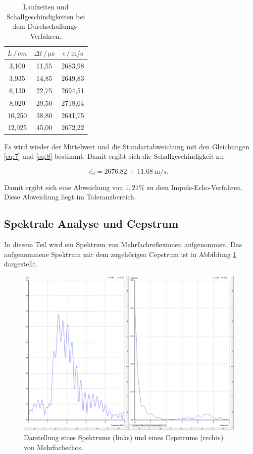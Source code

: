 \begin{table}[H]
  \centering
  \caption{Laufzeiten und Schallgeschindigkeiten bei dem Durchschallungs-Verfahren.}
  \label{tab:5}
  \begin{tabular}{c c c}
    \toprule
    $L \, / \, cm$ & $\Delta t \, / \, \si{\micro\second}$ & $c \, / \, \si{\meter\per\second}$ \\
    \midrule
     3,100 & 11,55 & 2683,98 \\
     3,935 & 14,85 & 2649,83 \\
     6,130 & 22,75 & 2694,51 \\
     8,020 & 29,50 & 2718,64 \\
    10,250 & 38,80 & 2641,75 \\
    12,025 & 45,00 & 2672,22 \\
    \bottomrule
  \end{tabular}
\end{table}

Es wird wieder der Mittelwert und die Standartabweichung mit den Gleichungen \ref{eq:7} und
\ref{eq:8} bestimmt. Damit ergibt sich die Schallgeschindigkeit zu:

\begin{equation*}
  \overline{c_d} = \SI{2676.82(1168)}{\meter\per\second}.
\end{equation*}

Damit ergibt sich eine Abweichung von $ 1,21 \% $ zu dem Impuls-Echo-Verfahren. Diese
Abweichung liegt im Toleranzbereich.

\subsection{Spektrale Analyse und Cepstrum}

In diesem Teil wird ein Spektrum von Mehrfachreflexionen aufgenommen. Das aufgenommene
Spektrum mir dem zugehörigen Cepstrum ist in Abbildung \ref{abb:3} dargestellt.

\begin{figure}[H]
  \centering
  \includegraphics[width=\textwidth]{content/FFT.png}
  \caption{Darstellung eines Spektrums (links) und eines Cepstrums (rechts) von Mehrfachechos.}
  \label{abb:3}
\end{figure}

